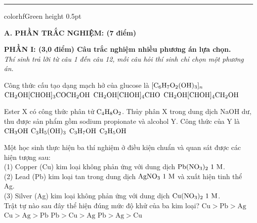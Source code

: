 \documentclass[11pt,a4paper]{article}
\begin{document}
\vspace{4pt}
\hrule color{hfGreen} height 0.5pt

\vspace{4pt}
\noindent
{\color{mainGreen}\textbf{\Large A. PHẦN TRẮC NGHIỆM: (7 điểm)}}

\vspace{3pt}
\noindent
{\color{mainGreen}\textbf{\large PHẦN I: (3,0 điểm) Câu trắc nghiệm nhiều phương án lựa chọn.}}\\
\textit{\small Thí sinh trả lời từ câu 1 đến câu 12, mỗi câu hỏi thí sinh chỉ chọn một phương án.}
\vspace{2pt}

\begin{ex}
Công thức cấu tạo dạng mạch hở của glucose là
\choice
{$\ce{[C6H7O2(OH)3]_n}$}
{$\ce{CH2OH[CHOH]3COCH2OH}$}
{\True $\ce{CH2OH[CHOH]4CHO}$}
{$\ce{CH2OH[CHOH]4CH2OH}$}

\end{ex}
\begin{ex}
Ester X có công thức phân tử $\ce{C4H8O2}$. Thủy phân X trong dung dịch NaOH dư, thu được sản phẩm gồm sodium propionate và alcohol Y. Công thức của Y là
\choice
{\True $\ce{CH3OH}$}
{$\ce{C3H5(OH)3}$}
{$\ce{C3H7OH}$}
{$\ce{C2H5OH}$}

\end{ex}
\begin{ex}
Một học sinh thực hiện ba thí nghiệm ở điều kiện chuẩn và quan sát được các hiện tượng sau:\\
(1) Copper (Cu) kim loại không phản ứng với dung dịch $\ce{Pb(NO3)2}\ 1\text{ M}$.\\
(2) Lead (Pb) kim loại tan trong dung dịch $\ce{AgNO3}\ 1\text{ M}$ và xuất hiện tinh thể Ag.\\
(3) Silver (Ag) kim loại không phản ứng với dung dịch $\ce{Cu(NO3)2}\ 1\text{ M}$.\\
Trật tự nào sau đây thể hiện đúng mức độ khử của ba kim loại?
\choice
{$\text{Cu} > \text{Pb} > \text{Ag}$}
{$\text{Cu} > \text{Ag} > \text{Pb}$}
{\True $\text{Pb} > \text{Cu} > \text{Ag}$}
{$\text{Pb} > \text{Ag} > \text{Cu}$}

\end{ex}
\end{document}
